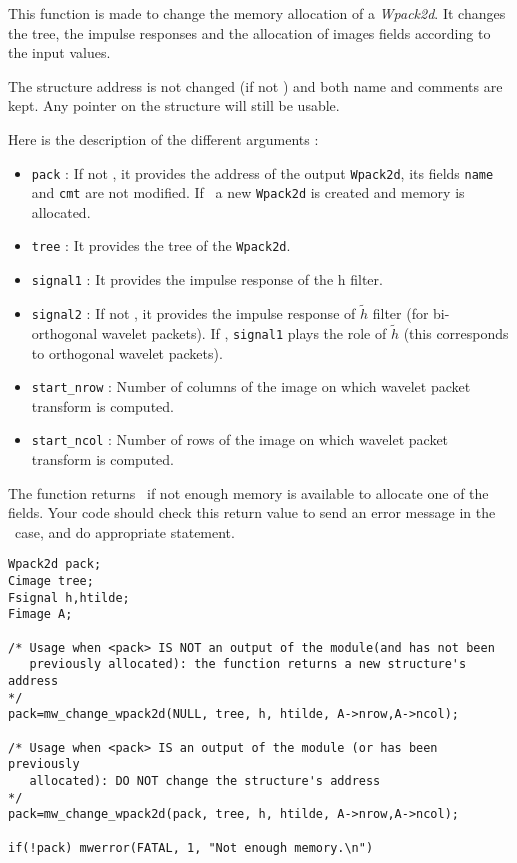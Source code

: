 \newpage %

\Description

This function is made to change the memory allocation of a {\em Wpack2d}.
It changes the tree, the impulse responses and the allocation of 
images fields according to the input values. 

The structure address is not changed (if not \Null) and both name and
comments are kept. Any pointer on the structure will still be usable.

Here is the description of the different arguments :
\begin{itemize}
\item \verb+pack+ : If not \Null, it provides the address of the output
  \verb+Wpack2d+, its fields \verb+name+ and \verb+cmt+ are not modified. 
  If \Null\ a new \verb+Wpack2d+ is created and memory is allocated.
\item \verb+tree+ : It provides the tree of the \verb+Wpack2d+.
\item \verb+signal1+ : It provides the impulse response of the h filter.
\item \verb+signal2+ : If not \Null, it provides the impulse response of
   $\tilde{h}$ filter (for bi-orthogonal wavelet packets). If \Null, \verb+signal1+
 plays the role of $\tilde{h}$ (this corresponds to orthogonal wavelet packets). 
\item \verb+start_nrow+ : Number of columns of the image on which wavelet packet transform is computed.
\item \verb+start_ncol+ : Number of rows of the image on which wavelet packet transform is computed.
\end{itemize}

The function returns \Null\ if not enough memory is available to allocate one of the fields. 
Your code should check this return value to send an error message in the \Null\ case, and do appropriate statement.

\Next
\Example
\begin{verbatim}
Wpack2d pack;
Cimage tree;
Fsignal h,htilde;
Fimage A;

/* Usage when <pack> IS NOT an output of the module(and has not been
   previously allocated): the function returns a new structure's address
*/
pack=mw_change_wpack2d(NULL, tree, h, htilde, A->nrow,A->ncol);

/* Usage when <pack> IS an output of the module (or has been previously
   allocated): DO NOT change the structure's address
*/
pack=mw_change_wpack2d(pack, tree, h, htilde, A->nrow,A->ncol);

if(!pack) mwerror(FATAL, 1, "Not enough memory.\n")

\end{verbatim}


